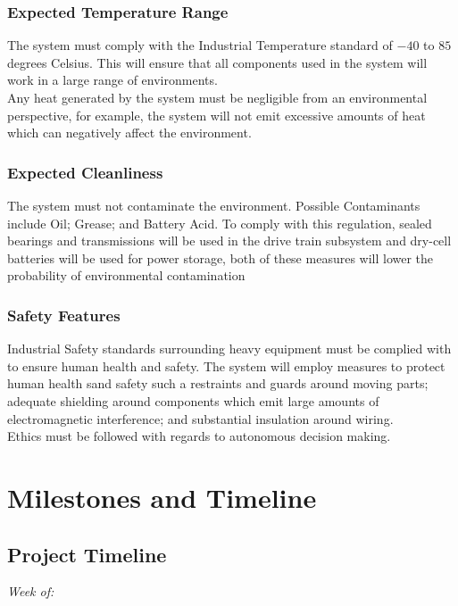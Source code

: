\documentclass[12pt]{article}
\begin{document}
\subsubsection{Expected Temperature Range}
The system must comply with the Industrial Temperature standard of $-40$ to $85$ degrees Celsius. This will ensure that all components used in the system will work in a large range of environments. \\

Any heat generated by the system must be negligible from an environmental perspective, for example, the system will not emit excessive amounts of heat which can negatively affect the environment. 
\subsubsection{Expected Cleanliness}
The system must not contaminate the environment. Possible Contaminants include Oil; Grease; and Battery Acid. To comply with this regulation, sealed bearings and transmissions will be used in the drive train subsystem and dry-cell batteries will be used for power storage, both of these measures will lower the probability of environmental contamination
\subsubsection{Safety Features}
Industrial Safety standards surrounding heavy equipment must be complied with to ensure human health and safety. The system will employ measures to protect human health sand safety such a restraints and guards around moving parts; adequate shielding around components which emit large amounts of electromagnetic interference; and substantial insulation around wiring. \\

Ethics must be followed with regards to autonomous decision making. 

\clearpage
\section{Milestones and Timeline}
\subsection{Project Timeline}


\textit{Week of:}
\end{document}

